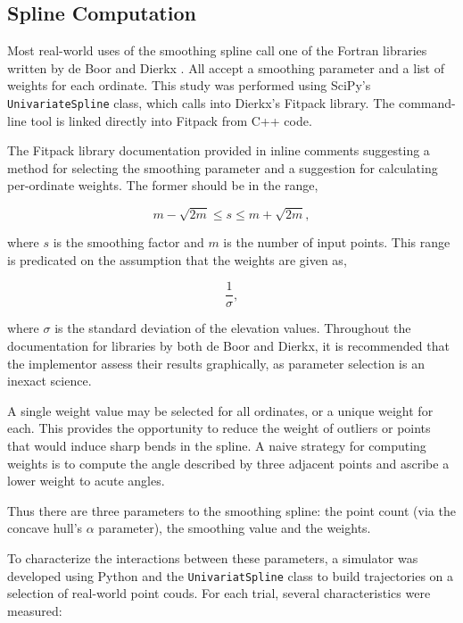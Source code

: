 \documentclass[doc]{apa6}
\begin{document}
\subsection{Spline Computation}

Most real-world uses of the smoothing spline call one of the Fortran libraries written by de Boor \parencite{deBoor1980} and Dierkx \parencite{Dierckx:1993:CSF:151103}. All accept a smoothing parameter and a list of weights for each ordinate. This study was performed using SciPy's \lstinline{UnivariateSpline} class, which calls into Dierkx's Fitpack library. The command-line tool is linked directly into Fitpack from C++ code.

The Fitpack library documentation provided in inline comments suggesting a method for selecting the smoothing parameter and a suggestion for calculating per-ordinate weights. The former should be in the range,

\begin{equation}
m - \sqrt{2m} \leq s \leq m + \sqrt{2m},
\end{equation}

where $s$ is the smoothing factor and $m$ is the number of input points. This range is predicated on the assumption that the weights are given as,

\begin{equation}
\frac{1}{\sigma},
\end{equation}

where $\sigma$ is the standard deviation of the elevation values. Throughout the documentation for libraries by both de Boor and Dierkx, it is recommended that the implementor assess their results graphically, as parameter selection is an inexact science. 

A single weight value may be selected for all ordinates, or a unique weight for each. This provides the opportunity to reduce the weight of outliers or points that would induce sharp bends in the spline. A naive strategy for computing weights is to compute the angle described by three adjacent points and ascribe a lower weight to acute angles.

Thus there are three parameters to the smoothing spline: the point count (via the concave hull's $\alpha$ parameter), the smoothing value and the weights. 

To characterize the interactions between these parameters, a simulator was developed using Python and the \lstinline{UnivariatSpline} class to build trajectories on a selection of real-world point couds. For each trial, several characteristics were measured:
\end{document}
